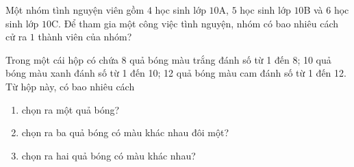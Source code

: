 \begin{bt}%
	Một nhóm tình nguyện viên gồm $4$ học sinh lớp $10$A, $5$ học sinh lớp  $10$B và $6$ học sinh lớp $10$C. Để tham gia một công việc tình nguyện, nhóm có bao nhiêu cách cử ra $1$ thành viên của nhóm?
\end{bt}

\begin{bt}%
	Trong một cái hộp có chứa 8 quả bóng màu trắng đánh số từ 1 đến 8; 10 quả bóng màu xanh đánh số từ 1 đến 10; 12 quả bóng màu cam đánh số từ 1 đến 12. Từ hộp này,  có bao nhiêu cách
	\begin{enumerate}
		\item chọn ra một quả  bóng?
		\item  chọn ra ba quả bóng có màu khác nhau đôi một?
		\item chọn ra hai quả bóng có  màu khác nhau?
	\end{enumerate}
\end{bt}

